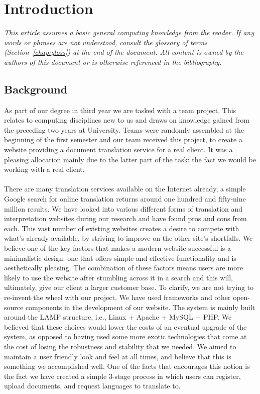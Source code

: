 \documentclass{l3proj}
\begin{document}
\chapter{Introduction}
\label{chap:intro}
\textit{\small{This article assumes a basic general computing knowledge from the
reader. If any words or phrases are not understood, consult the glossary of
terms (Section~\ref{chap:gloss}) at the end of the document. All content is
owned by the authors of this document or is otherwise referenced in the bibliography.}}\\
\section{Background}
As part of our degree in third year we are tasked with a team project. This
relates to computing disciplines new to us and draws on knowledge gained from
the preceding two years at University. Teams were randomly assembled at the
beginning of the first semester and our team received this project, to create a website
providing a document translation service for a real client. It was a pleasing
allocation mainly due to the latter part of the task: the fact we would be
working with a real client. \\
\\
There are many translation services available on the Internet already, a simple
Google search for online translation returns around one hundred and fifty-nine
million results. We have looked into various different forms of translation and
interpretation websites during our research and have found pros and cons from
each. This vast number of existing websites creates a desire to compete 
with what's already available, by striving to improve on the other site's
shortfalls. We believe one of the key factors that makes a
modern website successful is a minimalistic design: one that offers simple and effective
functionality and is aesthetically pleasing. The combination of these factors 
means users are more likely to use the website after stumbling across it in a
search and this will, ultimately, give our client a larger customer base. To
clarify, we are not trying to re-invent the wheel with our project. We have used
frameworks and other open-source components in the development of our website.
The system is mainly built around the LAMP structure, i.e., Linux + Apache +
MySQL + PHP. We believed that these choices would lower the costs of an eventual
upgrade of the system, as opposed to having used some more exotic technologies
that come at the cost of losing the robustness and stability that we needed. We
aimed to maintain a user friendly look and feel at all times, and believe that
this is something we accomplished well. One of the facts that encourages this notion is the fact we
have created a simple 3-stage process in which users can register, upload
documents, and request languages to translate to.\\ 
\end{document}

